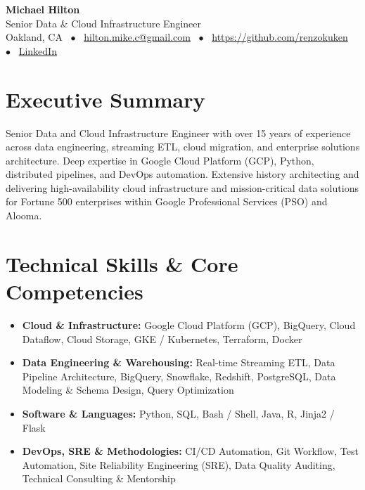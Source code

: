 \documentclass[10pt,letterpaper]{article}
\begin{document}
\begin{center}
    {\Huge \textbf{Michael Hilton}}\\[0.25em]
    {\large \color{mutedtext} Senior Data \& Cloud Infrastructure Engineer}\\[0.4em]
    \small \color{mutedtext}
    Oakland, CA \ $\bullet$ \
    \href{mailto:hilton.mike.c@gmail.com}{hilton.mike.c@gmail.com} \ $\bullet$ \
    \href{https://github.com/renzokuken}{https://github.com/renzokuken}
        \ $\bullet$ \ \href{https://www.linkedin.com/in/mike-hilton-0919b511/}{LinkedIn}
    \end{center}

\vspace{-0.5em}

\section*{Executive Summary}
\small
Senior Data and Cloud Infrastructure Engineer with over 15 years of experience across data engineering, streaming ETL, cloud migration, and enterprise solutions architecture. Deep expertise in Google Cloud Platform (GCP), Python, distributed pipelines, and DevOps automation. Extensive history architecting and delivering high-availability cloud infrastructure and mission-critical data solutions for Fortune 500 enterprises within Google Professional Services (PSO) and Alooma.

\section*{Technical Skills \& Core Competencies}
\small
\begin{itemize}[leftmargin=1.2em, itemsep=2pt, topsep=2pt]
    \item \textbf{Cloud \& Infrastructure:} Google Cloud Platform (GCP), BigQuery, Cloud Dataflow, Cloud Storage, GKE / Kubernetes, Terraform, Docker
    \item \textbf{Data Engineering \& Warehousing:} Real-time Streaming ETL, Data Pipeline Architecture, BigQuery, Snowflake, Redshift, PostgreSQL, Data Modeling \& Schema Design, Query Optimization
    \item \textbf{Software \& Languages:} Python, SQL, Bash / Shell, Java, R, Jinja2 / Flask
    \item \textbf{DevOps, SRE \& Methodologies:} CI/CD Automation, Git Workflow, Test Automation, Site Reliability Engineering (SRE), Data Quality Auditing, Technical Consulting \& Mentorship
\end{itemize}
\end{document}
